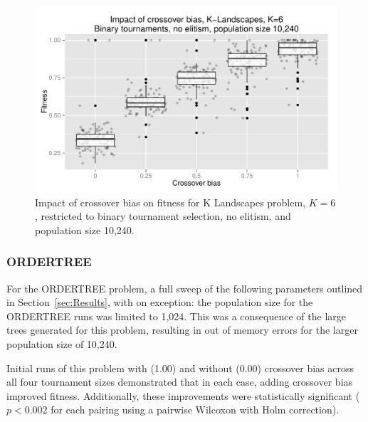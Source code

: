 \documentclass{sig-alternate}
\begin{document}
\begin{figure}
\centering
\includegraphics[width=0.45 \textwidth]{Plots/KLandscapes6_XO_bias_strong_impact_alpha_075.pdf}
\caption{Impact of crossover bias on fitness for K Landscapes problem, $K=6$, restricted to binary tournament
selection, no elitism, and population size 10,240.}
\label{fig:KLandscapes6_strong_results}
\end{figure}

%
%
%
%

%
%
%
%

\subsubsection{ORDERTREE}

For the ORDERTREE problem, a full sweep of the following parameters outlined in Section~\ref{sec:Results}, with on
exception: the population size for the ORDERTREE runs was limited to 1,024. This was a consequence of the large trees
generated for this problem, resulting in out of memory errors for the larger population size of 10,240.

Initial runs of this problem with (1.00) and without (0.00) crossover bias across all four tournament sizes
demonstrated that in each case, adding crossover bias improved fitness. Additionally, these improvements were
statistically significant ($p < 0.002$ for each pairing using a pairwise Wilcoxon with Holm correction).
\end{document}

